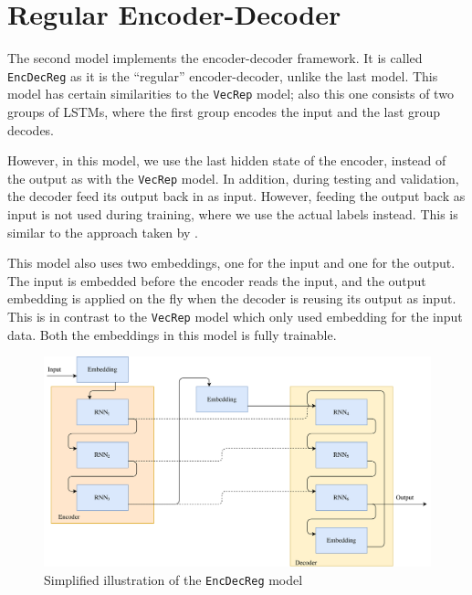
\section{Regular Encoder-Decoder}
\label{sec:regular_encoder_decoder}
The second model implements the encoder-decoder framework. It is called {\tt EncDecReg} as it is the ``regular'' encoder-decoder, unlike the last model. This model has certain similarities to the {\tt VecRep} model; also this one consists of two groups of LSTMs, where the first group encodes the input and the last group decodes.

However, in this model, we use the last hidden state of the encoder, instead of the output as with the {\tt VecRep} model. In addition, during testing and validation, the decoder feed its output back in as input. However, feeding the output back as input is not used during training, where we use the actual labels instead. This is similar to the approach taken by \cite{bengio2015scheduled}.

This model also uses two embeddings, one for the input and one for the output. The input is embedded before the encoder reads the input, and the output embedding is applied on the fly when the decoder is reusing its output as input. This is in contrast to the {\tt VecRep} model which only used embedding for the input data. Both the embeddings in this model is fully trainable.

\begin{figure}[!ht]
    \centering
    \includegraphics[width=1\textwidth]{fig/models/encdecreg_model.png}
    \caption{Simplified illustration of the {\tt EncDecReg} model}
    \label{fig:encdecreg_model}
\end{figure}

